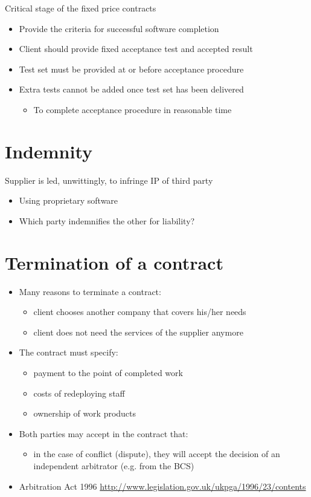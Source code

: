 \documentclass{article}
\begin{document}
Critical stage of the fixed price contracts
\begin{itemize}
\item Provide the criteria for successful software completion
\item Client should provide fixed acceptance test and accepted result
\item Test set must be provided at or before acceptance procedure
\item Extra tests cannot be added once test set has been delivered
\begin{itemize}
\item To complete acceptance procedure in reasonable time
\end{itemize}
\end{itemize}


\newpage
\section{Indemnity}
\begin{definition}[Indemnity]

Supplier is led, unwittingly, to infringe IP of third party 
\begin{itemize}
	\item Using proprietary software
	\item Which party indemnifies the other for liability?
\end{itemize}

\end{definition}




\section{Termination of a contract}
\begin{itemize}
\item Many reasons to terminate a contract:
\begin{itemize}
\item client chooses another company that covers his/her needs
\item client does not need the services of the supplier anymore
\end{itemize}
\item The contract must specify:
\begin{itemize}
\item payment to the point of completed work
\item costs of redeploying staff
\item ownership of work products
\end{itemize}
\item Both parties may accept in the contract that:
\begin{itemize}
\item in the case of conflict (dispute), they will accept the decision of an independent arbitrator (e.g. from the BCS)
\end{itemize}
\item Arbitration Act 1996 \url{http://www.legislation.gov.uk/ukpga/1996/23/contents}
\end{itemize}
\end{document}
